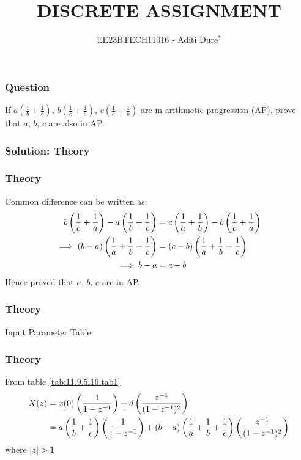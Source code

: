 \documentclass{beamer}
\begin{document}
\title{DISCRETE ASSIGNMENT}
\author{EE23BTECH11016 - Aditi Dure$^{*}$}
\date{}
\frame{\titlepage}

\begin{frame}
\frametitle{Question}
If $a\left(\frac{1}{b} + \frac{1}{c}\right)$, $b\left(\frac{1}{c} + \frac{1}{a}\right)$, $c\left(\frac{1}{a} + \frac{1}{b}\right)$ are in arithmetic progression (AP), prove that $a$, $b$, $c$ are also in AP.
\end{frame}

\begin{frame}
\frametitle{Solution: Theory}
\frametitle{Theory}
Common difference can be written as: 
\begin{align}
b\left(\frac{1}{c} + \frac{1}{a}\right) - a\left(\frac{1}{b} + \frac{1}{c}\right) &= c\left(\frac{1}{a} + \frac{1}{b}\right) - b\left(\frac{1}{c} + \frac{1}{a}\right)  \\ \implies
(b - a)\left(\frac{1}{a} + \frac{1}{b} + \frac{1}{c}\right) &= (c - b)\left(\frac{1}{a} + \frac{1}{b} + \frac{1}{c}\right) \\ \implies
b - a &= c - b  
\end{align}
Hence proved that $a$, $b$, $c$ are in AP. 
\end{frame}

\begin{frame}
\frametitle{Theory}
\begin{table}[!h]

\caption{Input Parameter Table}
\label{tab:11.9.5.16.tab1}
\end{table}
\end{frame}

\begin{frame}
\frametitle{Theory}
From table \ref{tab:11.9.5.16.tab1}
\begin{align}
X(z) &= x(0)\left(\frac{1}{1- z^{-1}}\right) + d\left(\frac{z^{-1}}{(1-z^{-1})^2}\right) \\
&= a\left(\frac{1}{b} + \frac{1}{c}\right)\left(\frac{1}{1- z^{-1}}\right) + (b - a)\left(\frac{1}{a}  + \frac{1}{b} + \frac{1}{c}\right)\left(\frac{z^{-1}}{(1-z^{-1})^2}\right) 
\end{align}
where $\left\vert z\right\vert >1$
\end{frame}
\end{document}
